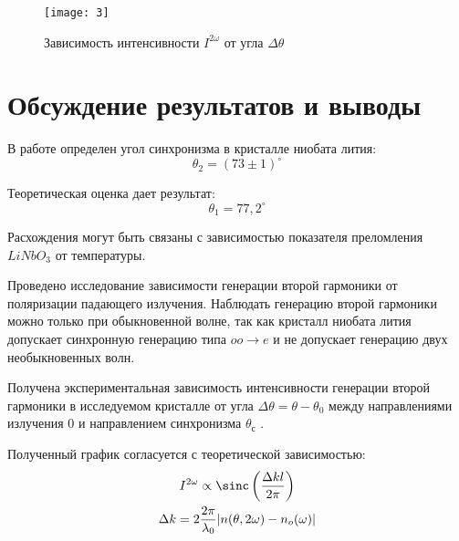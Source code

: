 \documentclass[a4paper, 12pt]{article}
\begin{document}
\begin{figure}[H]
    \texttt{[image: 3]} 
\caption{Зависимость интенсивности $I ^{2\omega}$ от угла $\Delta
\theta$}
\label{fig:3}
\end{figure}



\section{Обсуждение результатов и выводы}
В работе определен угол синхронизма в кристалле ниобата лития:
\[
    \theta_2 = (73 \pm 1)^\circ
\]

Теоретическая оценка дает результат:
\[
   \theta_1 = 77,2^\circ 
\]

Расхождения могут быть связаны с зависимостью показателя преломления
$LiNbO_3$ от температуры.


Проведено исследование зависимости генерации второй гармоники от
поляризации падающего излучения. Наблюдать генерацию второй гармоники
можно только при обыкновенной волне, так как кристалл ниобата лития
допускает синхронную генерацию типа $oo \to e$ и не допускает
генерацию двух необыкновенных волн.


Получена экспериментальная
зависимость интенсивности генерации второй гармоники в исследуемом
кристалле от угла $\Delta \theta = \theta - \theta _{0}$ между
направлениями излучения $0$ и направлением синхронизма $\theta
_{\text{с}}$ .

Полученный график согласуется с теоретической зависимостью:
\begin{equation*}
    \begin{gathered}
    I ^{2\omega} \propto \sinc \left( \frac{\Delta k l}{2 \pi}
    \right)\\
    \Delta k = 2 \frac{2\pi}{\lambda_0}|n(\theta, 2\omega) -
    n_o(\omega)|
    \end{gathered}
\end{equation*}

\[
\]
\end{document}
